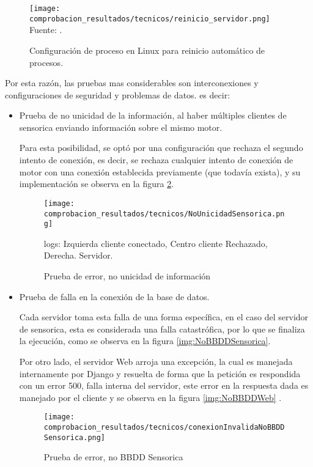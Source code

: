 \begin{figure}[H]
    \centering
    \caption{Configuración de proceso en Linux para reinicio automático de procesos.}
    \texttt{[image: comprobacion\_resultados/tecnicos/reinicio\_servidor.png]}
    Fuente: \textcite{configuracionprocesos}.
    \label{img:ProcesosLinux}
\end{figure}

Por esta razón, las pruebas mas considerables son interconexiones y configuraciones
de seguridad y problemas de datos. es decir:

\begin{itemize}
    \item Prueba de no unicidad de la información, al haber múltiples
        clientes de sensorica enviando información sobre el mismo motor.

        Para esta posibilidad, se optó por una configuración que rechaza el
        segundo intento de conexión, es decir, se rechaza cualquier intento de
        conexión de motor con una conexión establecida previamente (que todavía
        exista), y su implementación se observa en la figura \ref{img:NoUnicidad}.
        \begin{figure}[H]
            \centering
            \caption{Prueba de error, no unicidad de información}
            \texttt{[image: comprobacion\_resultados/tecnicos/NoUnicidadSensorica.png]}

            logs: Izquierda cliente conectado, Centro cliente Rechazado, Derecha.
            Servidor.
            \label{img:NoUnicidad}
        \end{figure}
    \item Prueba de falla en la conexión de la base de datos.

        Cada servidor toma esta falla de una forma específica, en el caso del
        servidor de sensorica, esta es considerada una falla catastrófica, por
        lo que se finaliza la ejecución, como se observa en la figura
        \ref{img:NoBBDDSensorica}.

        Por otro lado, el servidor Web arroja una excepción, la cual es manejada
        internamente por Django y resuelta de forma que la petición es respondida
        con un error 500, falla interna del servidor, este error en la respuesta
        dada es manejado por el cliente y se observa en la figura
        \ref{img:NoBBDDWeb} .
        \begin{figure}[H]
            \centering
            \caption{Prueba de error, no BBDD Sensorica}
            \texttt{[image: comprobacion\_resultados/tecnicos/conexionInvalidaNoBBDDSensorica.png]}


\end{figure}
\end{itemize}
